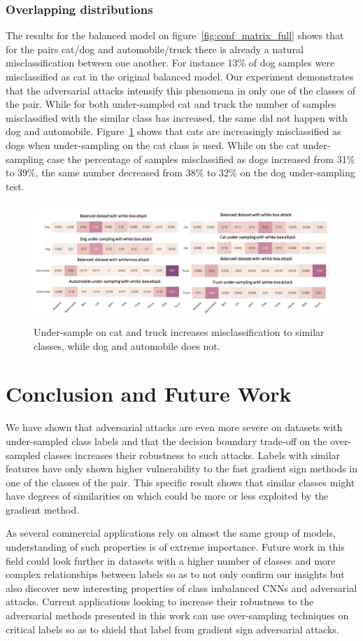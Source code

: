 \documentclass[runningheads,a4paper]{llncs}
\begin{document}
\subsubsection{Overlapping distributions} The results for the balanced model on figure~\ref{fig:conf_matrix_full} shows that for the pairs cat/dog and automobile/truck there is already a natural misclassification between one another. For instance 13\% of dog samples were misclassified as cat in the original balanced model. Our experiment demonstrates that the adversarial attacks intensify this phenomena in only one of the classes of the pair. While for both under-sampled cat and truck the number of samples misclassified with the similar class has increased, the same did not happen with dog and automobile. Figure~\ref{fig:overlap} shows that cats are increasingly misclassified as dogs when under-sampling on the cat class is used. While on the cat under-sampling case the percentage of samples misclassified as dogs increased from 31\% to 39\%, the same number decreased from 38\% to 32\% on the dog under-sampling test.
\begin{figure}
	\centering
	\includegraphics[height=4.5cm]{overlapping_all.png}
	\caption{Under-sample on cat and truck increases misclassification to similar classes, while dog and automobile does not.}
	\label{fig:overlap}
\end{figure}
\section{Conclusion and Future Work}

We have shown that adversarial attacks are even more severe on datasets with under-sampled class labels and that the decision boundary trade-off on the over-sampled classes increases their robustness to such attacks. Labels with similar features have only shown higher vulnerability to the fast gradient sign methods in one of the classes of the pair. This specific result shows that similar classes might have degrees of similarities on which could be more or less exploited by the gradient method.  

As several commercial applications rely on almost the same group of models, understanding of such properties is of extreme importance. Future work in this field could look further in datasets with a higher number of classes and more complex relationships between labels so as to not only confirm our insights but also discover new interesting properties of class imbalanced CNNs and adversarial attacks. Current applications looking to increase their robustness to the adversarial methods presented in this work can use over-sampling techniques on critical labels so as to shield that label from gradient sign adversarial attacks.



\end{document}
